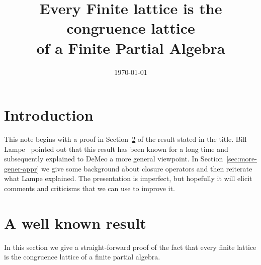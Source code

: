 
\usepackage{inputs/proof-dashed}



\usepackage{inputs/macros}

\usepackage[backend=bibtex]{biblatex}




\title[Partial Algebras]{Every Finite lattice is the congruence lattice\\
of a Finite Partial Algebra}
\date{\today}
\address{University of Hawaii}
\address{Chapman University}


\maketitle


\section{Introduction}
\label{sec:introduction}
This note begins with a proof in Section~\ref{sec:simple-proof-well} of the
result stated in the title. Bill Lampe~\cite{Lampe:20161017} pointed out that this result has been
known for a long time and subsequently explained to DeMeo a more general
viewpoint.  In Section~\ref{sec:more-gener-appr}
we give some background about closure operators and then
reiterate what Lampe explained. The presentation is imperfect, but
hopefully it will elicit comments and criticisms that we can use to improve it.

\section{A well known result}
\label{sec:simple-proof-well}
In this section we give a straight-forward proof of the fact that every finite
lattice is the congruence lattice of a finite partial algebra.


